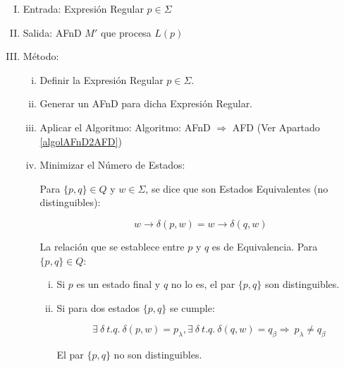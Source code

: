 \begin{enumerate}[I.]

\item Entrada: Expresión Regular $p \in \Sigma$

\item Salida: AFnD $M\prime$ que procesa $L(p)$

\item Método:
{
\begin{enumerate}[i.]
\item Definir la Expresión Regular $p \in \Sigma$.

\item Generar un AFnD para dicha Expresión Regular.

\item Aplicar el Algoritmo: Algoritmo: AFnD $\Rightarrow$ AFD (Ver Apartado \ref{algolAFnD2AFD})

\item Minimizar el Número de Estados:
{

 Para $\{p,q\} \in Q$ y $w \in \Sigma$, se dice que son Estados Equivalentes (no distinguibles):

\begin{equation}
w\longrightarrow \delta(p,w) = w\longrightarrow \delta(q,w) 
\end{equation}

{\cor La relación que se establece entre $p$ y $q$ es de Equivalencia.}
\form Para $\{p,q\} \in Q$:
\begin{enumerate}[i.]

\item Si $p$ es un estado final y $q$ no lo es, el par $\{p,q\}$ son distinguibles.

\item Si para dos estados $\{p,q\}$ se cumple:

\begin{equation}
\exists\ \delta\ t.q.\ \delta(p,w) = p_\lambda, \exists\ \delta\ t.q.\ \delta(q,w) = q_\beta \Rightarrow \ p_\lambda \neq q_\beta
\end{equation}

El par $\{p,q\}$ no son distinguibles.  

\end{enumerate}
}
\end{enumerate}
}
\end{enumerate}

